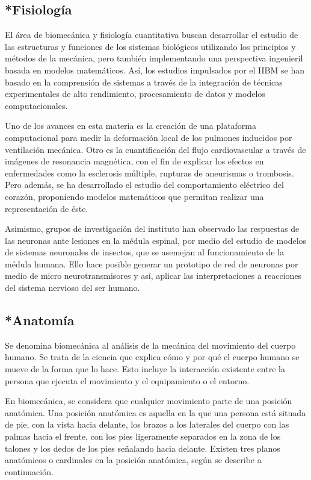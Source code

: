 \documentclass{article}
\begin{document}
\subsection{*Fisiología}
El área de biomecánica y fisiología cuantitativa buscan desarrollar el estudio de las estructuras y funciones de los sistemas biológicos utilizando los principios y métodos de la mecánica, pero también implementando una perspectiva ingenieril basada en modelos matemáticos. Así, los estudios impulsados por el IIBM se han basado en la comprensión de sistemas a través de la integración de técnicas experimentales de alto rendimiento, procesamiento de datos y modelos computacionales.

Uno de los avances en esta materia es la creación de una plataforma computacional para medir la deformación local de los pulmones inducidos por ventilación mecánica. Otro es la cuantificación del flujo cardiovascular a través de imágenes de resonancia magnética, con el fin de explicar los efectos en enfermedades como la esclerosis múltiple, rupturas de aneurismas o trombosis. Pero además, se ha desarrollado el estudio del comportamiento eléctrico del corazón, proponiendo modelos matemáticos que permitan realizar una representación de éste.

Asimismo, grupos de investigación del instituto han observado las respuestas de las neuronas ante lesiones en la médula espinal, por medio del estudio de modelos de sistemas neuronales de insectos, que se asemejan al funcionamiento de la médula humana. Ello hace posible generar un prototipo de red de neuronas por medio de micro neurotransmisores y así, aplicar las interpretaciones a reacciones del sistema nervioso del ser humano. \cite{3}

\subsection{*Anatomía}
Se denomina biomecánica al análisis de la mecánica del movimiento del cuerpo humano. Se trata de la ciencia que explica cómo y por qué el cuerpo humano se mueve de la forma que lo hace. Esto incluye la interacción existente entre la persona que ejecuta el movimiento y el equipamiento o el entorno.

En biomecánica, se considera que cualquier movimiento parte de una posición anatómica. Una posición anatómica es aquella en la que una persona está situada de pie, con la vista hacia delante, los brazos a los laterales del cuerpo con las palmas hacia el frente, con los pies ligeramente separados en la zona de los talones y los dedos de los pies señalando hacia delante. Existen tres planos anatómicos o cardinales en la posición anatómica, según se describe a continuación.
\end{document}
